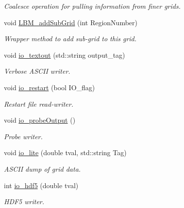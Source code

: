 \begin{DoxyCompactItemize}
\begin{DoxyCompactList}\small\item\em Coalesce operation for pulling information from finer grids. \end{DoxyCompactList}\item 
void \hyperlink{class_grid_obj_ab0d47be7ccafaa84b5d43da69e2082b9}{L\+B\+M\+\_\+add\+Sub\+Grid} (int Region\+Number)
\begin{DoxyCompactList}\small\item\em Wrapper method to add sub-\/grid to this grid. \end{DoxyCompactList}\item 
void \hyperlink{class_grid_obj_a1f334215b7789ea1ad8e2d1e15c67fb2}{io\+\_\+textout} (std\+::string output\+\_\+tag)
\begin{DoxyCompactList}\small\item\em Verbose A\+S\+C\+II writer. \end{DoxyCompactList}\item 
void \hyperlink{class_grid_obj_a940b825873a33b2fc9375f7a8f9bffc7}{io\+\_\+restart} (bool I\+O\+\_\+flag)
\begin{DoxyCompactList}\small\item\em Restart file read-\/writer. \end{DoxyCompactList}\item 
void \hyperlink{class_grid_obj_af7e8782f95d15884d761cc4f1d5926c0}{io\+\_\+probe\+Output} ()
\begin{DoxyCompactList}\small\item\em Probe writer. \end{DoxyCompactList}\item 
void \hyperlink{class_grid_obj_acf311bbf350fd48104663eaabebca835}{io\+\_\+lite} (double tval, std\+::string Tag)
\begin{DoxyCompactList}\small\item\em A\+S\+C\+II dump of grid data. \end{DoxyCompactList}\item 
int \hyperlink{class_grid_obj_adc960ac818748b839e81d1375782caa7}{io\+\_\+hdf5} (double tval)
\begin{DoxyCompactList}\small\item\em H\+D\+F5 writer. \end{DoxyCompactList}\end{DoxyCompactItemize}
